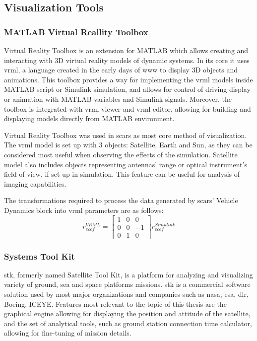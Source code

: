 \subsection{Visualization Tools}\label{sec:visualization}
    \subsubsection{MATLAB Virtual Reallity Toolbox}
        Virtual Reality Toolbox is an extension for MATLAB which allows creating and interacting with 3D virtual reality models of dynamic systems. In its core it uses \ac{vrml}, a language created in the early days of \ac{www} to display 3D objects and animations. This toolbox provides a way for implementing the \ac{vrml} models inside MATLAB script or Simulink simulation, and allows for control of driving display or animation with MATLAB variables and Simulink signals. Moreover, the toolbox is integrated with \ac{vrml} viewer and \ac{vrml} editor, allowing for building and displaying models directly from MATLAB environment.

        Virtual Reality Toolbox was used in \ac{scars} as most core method of visualization. The \ac{vrml} model is set up with 3 objects: Satellite, Earth and Sun, as they can be considered most useful when observing the effects of the simulation. Satellite model also includes objects representing antennas' range or optical instrument's field of view, if set up in simulation. This feature can be useful for analysis of imaging capabilities.

        The transformations required to process the data generated by \ac{scars}' Vehicle Dynamics block into \ac{vrml} parameters are as follows:
        \begin{equation}
            r_{ecef}^{VRML}=
            \begin{bmatrix}
            1&0&0\\ 
            0&0&-1\\ 
            0&1&0
            \end{bmatrix}
            r^{Simulink}_{ecef}
        \end{equation}
        
        

    \subsubsection{Systems Tool Kit}
        \ac{stk}, formerly named Satellite Tool Kit, is a platform for analyzing and visualizing variety of ground, sea and space platforms missions. \ac{stk} is a commercial software solution used by most major organizations and companies such as \ac{nasa}, \ac{esa}, \ac{dlr}, Boeing, ICEYE. Features most relevant to the topic of this thesis are the graphical engine allowing for displaying the position and attitude of the satellite, and the set of analytical tools, such as ground station connection time calculator, allowing for fine-tuning of mission details.

